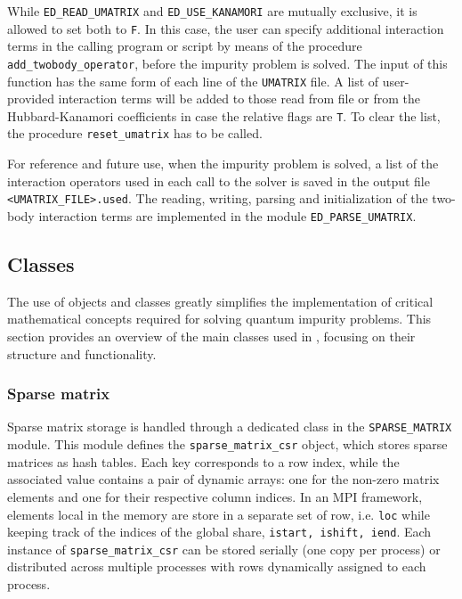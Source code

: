 \documentclass[edipack_sp.tex]{subfiles}
\begin{document}
While {\tt ED\_READ\_UMATRIX} and {\tt ED\_USE\_KANAMORI}
are mutually exclusive, it is allowed to set both to {\tt F}. 
In this case, the user can specify additional interaction terms in the calling program or script by means of the procedure {\tt add\_twobody\_operator}, before the impurity problem is solved. The input of this function has the same form of each line of the {\tt UMATRIX} file. 
A list of user-provided interaction terms will be added to those read from file or from the Hubbard-Kanamori coefficients in case the relative flags are {\tt T}. To clear the list, the procedure {\tt reset\_umatrix} has to be called.

For reference and future use, when the impurity problem is solved, a list of the interaction operators used in each call to the solver is saved in the output file 
{\tt <UMATRIX\_FILE>.used}.
The reading, writing, parsing and initialization of the two-body interaction terms are implemented in the module {\tt ED\_PARSE\_UMATRIX}.
















\subsection{Classes}
The use of objects and classes greatly simplifies the implementation of critical mathematical concepts required for solving quantum 
impurity problems. This section provides an overview of the main 
classes used in \NAME, focusing on their structure and functionality.


\subsubsection{Sparse matrix}\label{CodeSparseMatrix}
Sparse matrix storage is handled through a dedicated class in the 
{\tt SPARSE\_MATRIX} module. This module defines the 
{\tt sparse\_matrix\_csr} object, which stores sparse matrices as 
hash tables. Each key corresponds to a row index, while the associated 
value contains a pair of dynamic arrays: one for the non-zero matrix 
elements and one for their respective column indices. 
In an MPI framework, elements local in the memory are store in a separate set of row, i.e. {\tt loc} while keeping track of the indices of the global share, {\tt istart, ishift, iend}. 
Each instance of {\tt sparse\_matrix\_csr} can be stored serially (one copy per process) or distributed across multiple 
processes with rows dynamically assigned to each process. 
\end{document}
